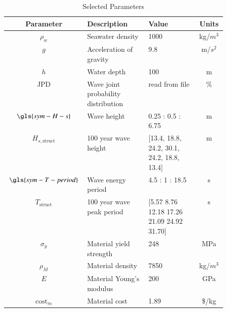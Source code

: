 \begin{table}[ht]
\centering
\setlength\tabcolsep{2pt}
\renewcommand{\arraystretch}{1.4}
\caption{Selected Parameters}\label{remdo:tab:parameters}
\begin{tabular}{cP{0.28\linewidth}P{0.23\linewidth}c}
\textbf{Parameter} & \textbf{Description} & \textbf{Value} & \textbf{Units}  \\ \hline
$\rho_w$ & Seawater density& 1000 & kg/$m^3$  \\ 
$g$& Acceleration of gravity& 9.8 & m/$s^2$  \\ 
$h$& Water depth & 100 & m  \\ 
JPD& Wave joint probability distribution & read from file \citep{janzou_sam_2022}  &\%  \\ 
$\gls{sym-H-s}$ & Wave height \citep{janzou_sam_2022}& 0.25 : 0.5 : 6.75  & m  \\ 
$H_{s,\text{struct}}$ & 100 year wave height \citep{berg_extreme_2011}& [13.4, 18.8, 24.2, 30.1, 24.2, 18.8, 13.4] & m  \\ 
$\gls{sym-T-period}$& Wave energy period \citep{janzou_sam_2022}& 4.5 : 1 : 18.5  & s  \\ 
$T_{\text{struct}}$ & 100 year wave peak period \citep{berg_extreme_2011}& [5.57 8.76 12.18 17.26 21.09 24.92 31.70] & s  \\ 
$\sigma_y$ & Material yield strength& 248 & MPa  \\ 
$\rho_M$ & Material density& 7850 & kg/$m^3$  \\ 
$E$& Material Young's modulus& 200 & GPa  \\ 
$\text{cost}_m$ & Material cost& 1.89 & \$/kg \\ 

\end{tabular}
\end{table}
